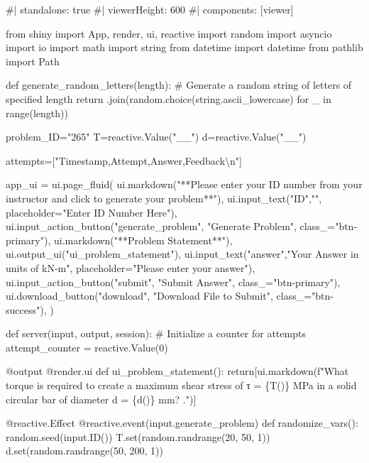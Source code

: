 \documentclass[
  letterpaper,
  DIV=11,
  numbers=noendperiod]{scrreprt}
\newenvironment{Shaded}{\begin{snugshade}}{\end{snugshade}}
\newcommand{\NormalTok}[1]{\textcolor[rgb]{0.00,0.23,0.31}{#1}}
\begin{document}
\begin{Shaded}
\begin{Highlighting}[]
\NormalTok{\#| standalone: true}
\NormalTok{\#| viewerHeight: 600}
\NormalTok{\#| components: [viewer]}

\NormalTok{from shiny import App, render, ui, reactive}
\NormalTok{import random}
\NormalTok{import asyncio}
\NormalTok{import io}
\NormalTok{import math}
\NormalTok{import string}
\NormalTok{from datetime import datetime}
\NormalTok{from pathlib import Path}

\NormalTok{def generate\_random\_letters(length):}
\NormalTok{    \# Generate a random string of letters of specified length}
\NormalTok{    return \textquotesingle{}\textquotesingle{}.join(random.choice(string.ascii\_lowercase) for \_ in range(length)) }

\NormalTok{problem\_ID="265"}
\NormalTok{T=reactive.Value("\_\_")}
\NormalTok{d=reactive.Value("\_\_")}


\NormalTok{attempts=["Timestamp,Attempt,Answer,Feedback\textbackslash{}n"]}

\NormalTok{app\_ui = ui.page\_fluid(}
\NormalTok{    ui.markdown("**Please enter your ID number from your instructor and click to generate your problem**"),}
\NormalTok{    ui.input\_text("ID","", placeholder="Enter ID Number Here"),}
\NormalTok{    ui.input\_action\_button("generate\_problem", "Generate Problem", class\_="btn{-}primary"),}
\NormalTok{    ui.markdown("**Problem Statement**"),}
\NormalTok{    ui.output\_ui("ui\_problem\_statement"),}
\NormalTok{    ui.input\_text("answer","Your Answer in units of kN{-}m", placeholder="Please enter your answer"),}
\NormalTok{    ui.input\_action\_button("submit", "Submit Answer", class\_="btn{-}primary"),}
\NormalTok{    ui.download\_button("download", "Download File to Submit", class\_="btn{-}success"),}
\NormalTok{)}


\NormalTok{def server(input, output, session):}
\NormalTok{    \# Initialize a counter for attempts}
\NormalTok{    attempt\_counter = reactive.Value(0)}

\NormalTok{    @output}
\NormalTok{    @render.ui}
\NormalTok{    def ui\_problem\_statement():}
\NormalTok{        return[ui.markdown(f"What torque is required to create a maximum shear stress of τ = \{T()\} MPa in a solid circular bar of diameter d  = \{d()\} mm? .")]}
    
\NormalTok{    @reactive.Effect}
\NormalTok{    @reactive.event(input.generate\_problem)}
\NormalTok{    def randomize\_vars():}
\NormalTok{        random.seed(input.ID())}
\NormalTok{        T.set(random.randrange(20, 50, 1))}
\NormalTok{        d.set(random.randrange(50, 200, 1))}
        

\end{Highlighting}
\end{Shaded}
\end{document}
